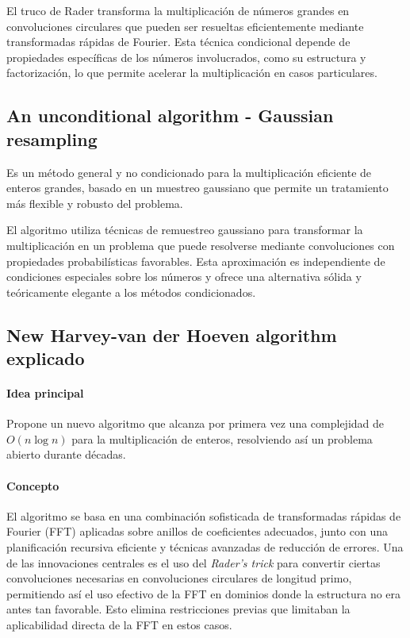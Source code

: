 El truco de Rader transforma la multiplicación de números grandes en convoluciones circulares que pueden ser resueltas eficientemente mediante transformadas rápidas de Fourier. Esta técnica condicional depende de propiedades específicas de los números involucrados, como su estructura y factorización, lo que permite acelerar la multiplicación en casos particulares.

\subsection{An unconditional algorithm - Gaussian resampling}

Es un método general y no condicionado para la multiplicación eficiente de enteros grandes, basado en un muestreo gaussiano que permite un tratamiento más flexible y robusto del problema.

El algoritmo utiliza técnicas de remuestreo gaussiano para transformar la multiplicación en un problema que puede resolverse mediante convoluciones con propiedades probabilísticas favorables. Esta aproximación es independiente de condiciones especiales sobre los números y ofrece una alternativa sólida y teóricamente elegante a los métodos condicionados.

\subsection{New Harvey-van der Hoeven algorithm explicado}

\paragraph{Idea principal} 
Propone un nuevo algoritmo que alcanza por primera vez una complejidad de \( O(n \log n) \) para la multiplicación de enteros, resolviendo así un problema abierto durante décadas.

\paragraph{Concepto} 
El algoritmo se basa en una combinación sofisticada de transformadas rápidas de Fourier (FFT) aplicadas sobre anillos de coeficientes adecuados, junto con una planificación recursiva eficiente y técnicas avanzadas de reducción de errores. Una de las innovaciones centrales es el uso del \textit{Rader's trick} para convertir ciertas convoluciones necesarias en convoluciones circulares de longitud primo, permitiendo así el uso efectivo de la FFT en dominios donde la estructura no era antes tan favorable. Esto elimina restricciones previas que limitaban la aplicabilidad directa de la FFT en estos casos.

